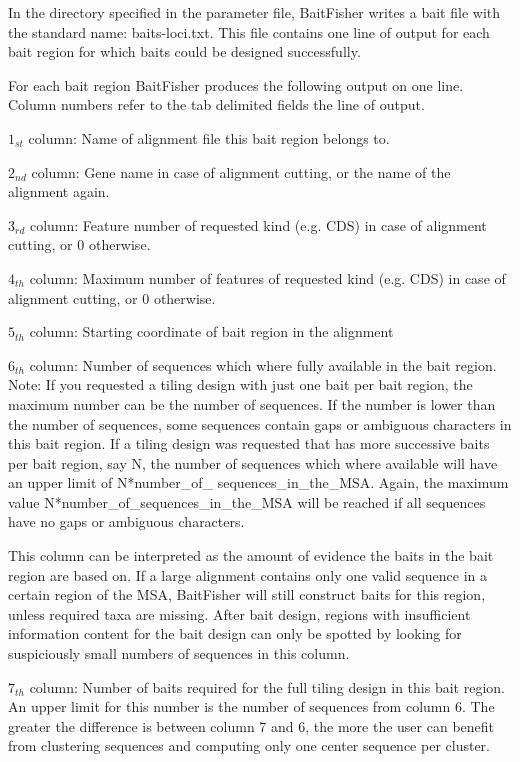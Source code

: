 \documentclass[a4paper,pdflatex,11pt]{article}
\begin{document}
In the directory specified in the parameter file, BaitFisher writes a
bait file with the standard name: baits-loci.txt. This file contains one
line of output for each bait region for which baits could be designed
successfully.

For each bait region BaitFisher produces the following output on one
line. Column numbers refer to the tab delimited fields the line of
output.

$1_{st}$ column: Name of alignment file this bait region
belongs to.

$2_{nd}$ column: Gene name in case of alignment cutting, or
the name of the alignment again.

$3_{rd}$ column: Feature number of requested kind (e.g.
CDS) in case of alignment cutting, or 0 otherwise.

$4_{th}$ column: Maximum number of features of requested
kind (e.g. CDS) in case of alignment cutting, or 0 otherwise.

$5_{th}$ column: Starting coordinate of bait region in the
alignment

$6_{th}$ column: Number of sequences which where fully
available in the bait region. Note: If you requested a tiling design
with just one bait per bait region, the maximum number can be the number
of sequences. If the number is lower than the number of sequences, some
sequences contain gaps or ambiguous characters in this bait region. If a
tiling design was requested that has more successive baits per bait
region, say N, the number of sequences which where available will have
an upper limit of N*number\_of\_ sequences\_in\_the\_MSA. Again, the
maximum value N*number\_of\_sequences\_in\_the\_MSA will be reached if
all sequences have no gaps or ambiguous characters.

This column can be interpreted as the amount of evidence the baits in
the bait region are based on. If a large alignment contains only one
valid sequence in a certain region of the MSA, BaitFisher will still
construct baits for this region, unless required taxa are missing. After
bait design, regions with insufficient information content for the bait
design can only be spotted by looking for suspiciously small numbers of
sequences in this column.

$7_{th}$ column: Number of baits required for the full
tiling design in this bait region. An upper limit for this number is the
number of sequences from column 6. The greater the difference is between
column 7 and 6, the more the user can benefit from clustering sequences
and computing only one center sequence per cluster.
\end{document}
